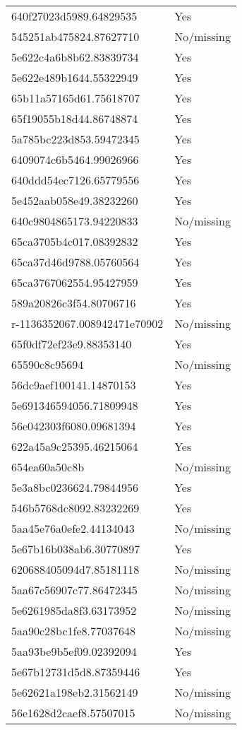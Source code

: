 \begin{tabular}{ll}
640f27023d5989.64829535 & Yes \\
545251ab475824.87627710 & No/missing \\
5e622c4a6b8b62.83839734 & Yes \\
5e622e489b1644.55322949 & Yes \\
65b11a57165d61.75618707 & Yes \\
65f19055b18d44.86748874 & Yes \\
5a785bc223d853.59472345 & Yes \\
6409074c6b5464.99026966 & Yes \\
640ddd54ec7126.65779556 & Yes \\
5e452aab058e49.38232260 & Yes \\
640c9804865173.94220833 & No/missing \\
65ca3705b4c017.08392832 & Yes \\
65ca37d46d9788.05760564 & Yes \\
65ca3767062554.95427959 & Yes \\
589a20826c3f54.80706716 & Yes \\
r-1136352067.008942471e70902 & No/missing \\
65f0df72ef23e9.88353140 & Yes \\
65590c8c95694 & No/missing \\
56dc9aef100141.14870153 & Yes \\
5e691346594056.71809948 & Yes \\
56e042303f6080.09681394 & Yes \\
622a45a9c25395.46215064 & Yes \\
654ea60a50c8b & No/missing \\
5e3a8bc0236624.79844956 & Yes \\
546b5768dc8092.83232269 & Yes \\
5aa45e76a0efe2.44134043 & No/missing \\
5e67b16b038ab6.30770897 & Yes \\
620688405094d7.85181118 & No/missing \\
5aa67c56907c77.86472345 & No/missing \\
5e6261985da8f3.63173952 & No/missing \\
5aa90c28bc1fe8.77037648 & No/missing \\
5aa93be9b5ef09.02392094 & Yes \\
5e67b12731d5d8.87359446 & Yes \\
5e62621a198eb2.31562149 & No/missing \\
56e1628d2caef8.57507015 & No/missing \\

\end{tabular}
